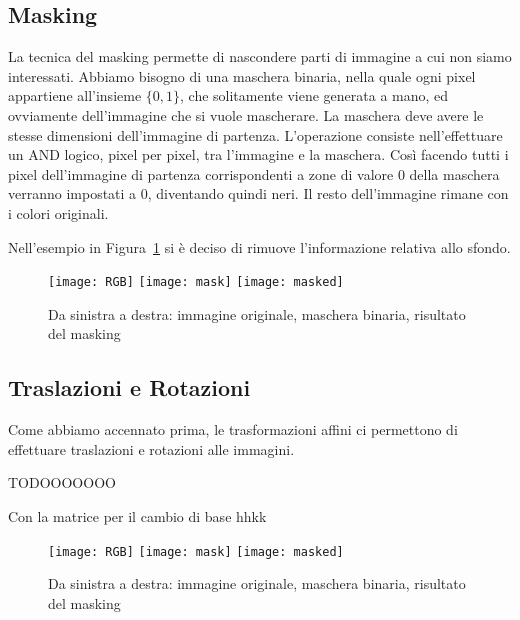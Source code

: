 \clearpage
\subsection {Masking}
La tecnica del masking permette di nascondere parti di immagine a cui non siamo interessati.
Abbiamo bisogno di una maschera binaria, nella quale ogni pixel appartiene all'insieme $\{0,1\}$, che solitamente viene generata a mano, ed ovviamente dell'immagine che si vuole mascherare.
La maschera deve avere le stesse dimensioni dell'immagine di partenza.
L'operazione consiste nell'effettuare un AND logico, pixel per pixel,  tra l'immagine e la maschera.
Così facendo tutti i pixel dell'immagine di partenza corrispondenti a zone di valore $0$ della maschera verranno impostati a $0$, diventando quindi neri.
Il resto dell'immagine rimane con i colori originali.

Nell'esempio in Figura~\ref{fig:mask_example} si è deciso di rimuove l'informazione relativa allo sfondo.
\begin{figure}[ht]
  \begin{center}
    \texttt{[image: RGB]}
    \texttt{[image: mask]}
    \texttt{[image: masked]}
    \label{fig:mask_example}
    \caption{Da sinistra a destra: immagine originale, maschera binaria, risultato del masking}
  \end{center}
\end{figure}


\clearpage
\subsection {Traslazioni e Rotazioni}
Come abbiamo accennato prima, le trasformazioni affini ci permettono di effettuare traslazioni e rotazioni alle immagini.

TODOOOOOOO

Con la matrice per il cambio di base hhkk
\begin{figure}[ht]
  \begin{center}
    \texttt{[image: RGB]}
    \texttt{[image: mask]}
    \texttt{[image: masked]}
    \label{fig:traslation_example}
    \caption{Da sinistra a destra: immagine originale, maschera binaria, risultato del masking}
  \end{center}
\end{figure}

